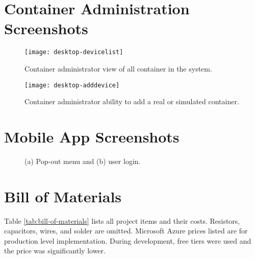 \appendix

\section{Container Administration Screenshots} \label{app:device-admin}

\begin{figure}[h]
\texttt{[image: desktop-devicelist]}
\caption{Container administrator view of all container in the system.}
\label{fig:desktop-devicelist}
\end{figure}

\begin{figure}[h]
\texttt{[image: desktop-adddevice]}
\caption{Container administrator ability to add a real or simulated container.}
\label{fig:desktop-adddevice}
\end{figure}

\section{Mobile App Screenshots} \label{app:screenshots}

\begin{figure}[h]
\centering
\begin{subfigure}{.5\textwidth}
  \centering
{}
\label{fig:mproto-1}
\end{subfigure}%
\begin{subfigure}{.5\textwidth}
  \centering
{}
\label{fig:mproto1-2}
\end{subfigure}
\caption{(a) Pop-out menu and (b) user login.}
\label{fig:mproto1-1-2}
\end{figure}

\section{Bill of Materials}

Table \ref{tab:bill-of-materials} lists all project items and their costs. Resistors, capacitors, wires, and solder are omitted. Microsoft Azure prices listed are for production level implementation. During development, free tiers were used and the price was significantly lower.

